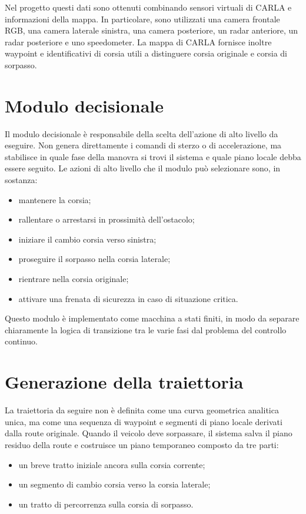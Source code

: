 Nel progetto questi dati sono ottenuti combinando sensori virtuali di CARLA e informazioni della mappa. In particolare, sono utilizzati una camera frontale RGB, una camera laterale sinistra, una camera posteriore, un radar anteriore, un radar posteriore e uno speedometer. La mappa di CARLA fornisce inoltre waypoint e identificativi di corsia utili a distinguere corsia originale e corsia di sorpasso.

\section{Modulo decisionale}

Il modulo decisionale è responsabile della scelta dell'azione di alto livello da eseguire. Non genera direttamente i comandi di sterzo o di accelerazione, ma stabilisce in quale fase della manovra si trovi il sistema e quale piano locale debba essere seguito. Le azioni di alto livello che il modulo può selezionare sono, in sostanza:

\begin{itemize}
    \item mantenere la corsia;
    \item rallentare o arrestarsi in prossimità dell'ostacolo;
    \item iniziare il cambio corsia verso sinistra;
    \item proseguire il sorpasso nella corsia laterale;
    \item rientrare nella corsia originale;
    \item attivare una frenata di sicurezza in caso di situazione critica.
\end{itemize}

Questo modulo è implementato come macchina a stati finiti, in modo da separare chiaramente la logica di transizione tra le varie fasi dal problema del controllo continuo.

\section{Generazione della traiettoria}

La traiettoria da seguire non è definita come una curva geometrica analitica unica, ma come una sequenza di waypoint e segmenti di piano locale derivati dalla route originale. Quando il veicolo deve sorpassare, il sistema salva il piano residuo della route e costruisce un piano temporaneo composto da tre parti:

\begin{itemize}
    \item un breve tratto iniziale ancora sulla corsia corrente;
    \item un segmento di cambio corsia verso la corsia laterale;
    \item un tratto di percorrenza sulla corsia di sorpasso.
\end{itemize}

